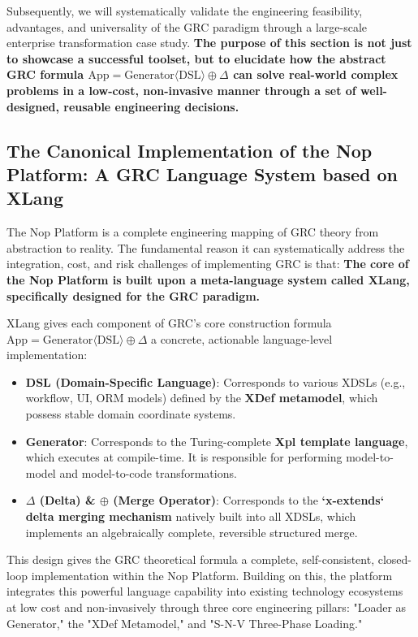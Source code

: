 \documentclass[11pt]{article}
\begin{document}
Subsequently, we will systematically validate the engineering feasibility, advantages, and universality of the GRC paradigm through a large-scale enterprise transformation case study. \textbf{The purpose of this section is not just to showcase a successful toolset, but to elucidate how the abstract GRC formula $\text{App} = \text{Generator}\langle\text{DSL}\rangle \oplus \Delta$ can solve real-world complex problems in a low-cost, non-invasive manner through a set of well-designed, reusable engineering decisions.}

\subsection{The Canonical Implementation of the Nop Platform: A GRC Language System based on XLang}

The Nop Platform is a complete engineering mapping of GRC theory from abstraction to reality. The fundamental reason it can systematically address the integration, cost, and risk challenges of implementing GRC is that: \textbf{The core of the Nop Platform is built upon a meta-language system called XLang, specifically designed for the GRC paradigm.}

XLang gives each component of GRC's core construction formula $\text{App} = \text{Generator}\langle\text{DSL}\rangle \oplus \Delta$ a concrete, actionable language-level implementation:
\begin{itemize}
    \item \textbf{DSL (Domain-Specific Language)}: Corresponds to various XDSLs (e.g., workflow, UI, ORM models) defined by the \textbf{XDef metamodel}, which possess stable domain coordinate systems.
    \item \textbf{Generator}: Corresponds to the Turing-complete \textbf{Xpl template language}, which executes at compile-time. It is responsible for performing model-to-model and model-to-code transformations.
    \item \textbf{$\Delta$ (Delta) \& $\oplus$ (Merge Operator)}: Corresponds to the \textbf{`x-extends` delta merging mechanism} natively built into all XDSLs, which implements an algebraically complete, reversible structured merge.
\end{itemize}

This design gives the GRC theoretical formula a complete, self-consistent, closed-loop implementation within the Nop Platform. Building on this, the platform integrates this powerful language capability into existing technology ecosystems at low cost and non-invasively through three core engineering pillars: "Loader as Generator," the "XDef Metamodel," and "S-N-V Three-Phase Loading."
\end{document}
